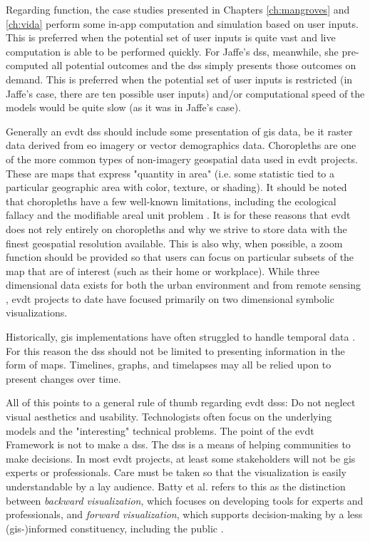Regarding function, the case studies presented in Chapters \ref{ch:mangroves} and \ref{ch:vida} perform some in-app computation and simulation based on user inputs. This is preferred when the potential set of user inputs is quite vast and live computation is able to be performed quickly. For Jaffe's \ac{dss}, meanwhile, she pre-computed all potential outcomes and the \ac{dss} simply presents those outcomes on demand. This is preferred when the potential set of user inputs is restricted (in Jaffe's case, there are ten possible user inputs) and/or computational speed of the models would be quite slow (as it was in Jaffe's case). 

Generally an \ac{evdt} \ac{dss} should include some presentation of \ac{gis} data, be it raster data derived from \ac{eo} imagery or vector demographics data. Choropleths are one of the more common types of non-imagery geospatial data used in \ac{evdt} projects. These are maps that express "quantity in area" (i.e. some statistic tied to a particular geographic area with color, texture, or shading). It should be noted that choropleths have a few well-known limitations, including the ecological fallacy and the modifiable areal unit problem \cite{cramptonRethinkingMapsIdentity2011, sawickiNeighborhoodIndicatorsReview1996}. It is for these reasons that \ac{evdt} does not rely entirely on choropleths and why we strive to store data with the finest geospatial resolution available. This is also why, when possible, a zoom function should be provided so that users can focus on particular subsets of the map that are of interest (such as their home or workplace). While three dimensional data exists for both the urban environment \cite{battyVisualizingCityCommunication2000} and from remote sensing \cite{sunAerial3DBuilding2013}, \ac{evdt} projects to date have focused primarily on two dimensional symbolic visualizations.

Historically, \ac{gis} implementations have often struggled to handle temporal data \cite{harrisLocationalModelsGeographic1993}. For this reason the \ac{dss} should not be limited to presenting information in the form of maps. Timelines, graphs, and timelapses may all be relied upon to present changes over time.

All of this points to a general rule of thumb regarding \ac{evdt} \acp{dss}: Do not neglect visual aesthetics and usability. Technologists often focus on the underlying models and the "interesting" technical problems. The point of the \ac{evdt} Framework is not to make a \ac{dss}. The \ac{dss} is a means of helping communities to make decisions. In most \ac{evdt} projects, at least some stakeholders will not be \ac{gis} experts or professionals. Care must be taken so that the visualization is easily understandable by a lay audience. Batty et al. refers to this as the distinction between \textit{backward visualization}, which focuses on developing tools for experts and professionals, and \textit{forward visualization}, which supports decision-making by a less (\ac{gis}-)informed constituency, including the public \cite{battyVisualizingCityCommunication2000}.

